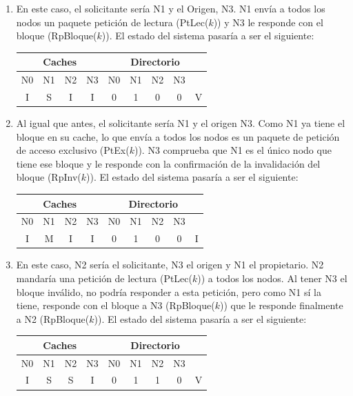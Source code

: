 \documentclass[10pt,a4paper,spanish]{report}
\begin{document}
\begin{enumerate}[1.]
    \item En este caso, el solicitante sería N1 y el Origen, N3. N1 envía a todos los nodos un paquete petición de lectura (PtLec($k$)) y N3 le responde con el bloque (RpBloque($k$)). El estado del sistema pasaría a ser el siguiente:

    \begin{center}
    \begin{tabular}{|c|c|c|c|c|c|c|c|c|}
    \hline
    \multicolumn{4}{|c|}{Caches} & \multicolumn{5}{|c|}{Directorio} \\
    \hline
    N0 & N1 & N2 & N3 & N0 & N1 & N2 & N3 & \\
    \hline
    I & S & I & I & 0 & 1 & 0 & 0 & V \\
    \hline
    \end{tabular}
    \end{center}

    \item Al igual que antes, el solicitante sería N1 y el origen N3. Como N1 ya tiene el bloque en su cache, lo que envía a todos los nodos es un paquete de petición de acceso exclusivo (PtEx($k$)). N3 comprueba que N1 es el único nodo que tiene ese bloque y le responde con la confirmación de la invalidación del bloque (RpInv($k$)). El estado del sistema pasaría a ser el siguiente:

    \begin{center}
    \begin{tabular}{|c|c|c|c|c|c|c|c|c|}
    \hline
    \multicolumn{4}{|c|}{Caches} & \multicolumn{5}{|c|}{Directorio} \\
    \hline
    N0 & N1 & N2 & N3 & N0 & N1 & N2 & N3 & \\
    \hline
    I & M & I & I & 0 & 1 & 0 & 0 & I \\
    \hline
    \end{tabular}
    \end{center}

    \item En este caso, N2 sería el solicitante, N3 el origen y N1 el propietario. N2 mandaría una petición de lectura (PtLec($k$)) a todos los nodos. Al tener N3 el bloque inválido, no podría responder a esta petición, pero como N1 sí la tiene, responde con el bloque a N3 (RpBloque($k$)) que le responde finalmente a N2 (RpBloque($k$)). El estado del sistema pasaría a ser el siguiente:

    \begin{center}
    \begin{tabular}{|c|c|c|c|c|c|c|c|c|}
    \hline
    \multicolumn{4}{|c|}{Caches} & \multicolumn{5}{|c|}{Directorio} \\
    \hline
    N0 & N1 & N2 & N3 & N0 & N1 & N2 & N3 & \\
    \hline
    I & S & S & I & 0 & 1 & 1 & 0 & V \\
    \hline
    \end{tabular}
    \end{center}    


\end{enumerate}
\end{document}
